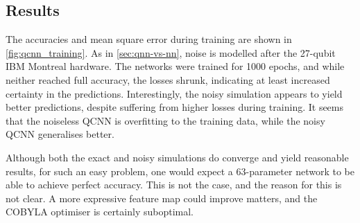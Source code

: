 \subsection{Results}
The accuracies and mean square error during training are shown in \cref{fig:qcnn_training}.
As in \cref{sec:qnn-vs-nn}, noise is modelled after the 27-qubit IBM Montreal hardware.
The networks were trained for 1000 epochs, and while neither reached full accuracy, the losses shrunk, indicating at least increased certainty in the predictions.
Interestingly, the noisy simulation appears to yield better predictions, despite suffering from higher losses during training.
It seems that the noiseless QCNN is overfitting to the training data, while the noisy QCNN generalises better.

Although both the exact and noisy simulations do converge and yield reasonable results, for such an easy problem, one would expect a 63-parameter network to be able to achieve perfect accuracy.
This is not the case, and the reason for this is not clear.
A more expressive feature map could improve matters, and the COBYLA optimiser is certainly suboptimal.


